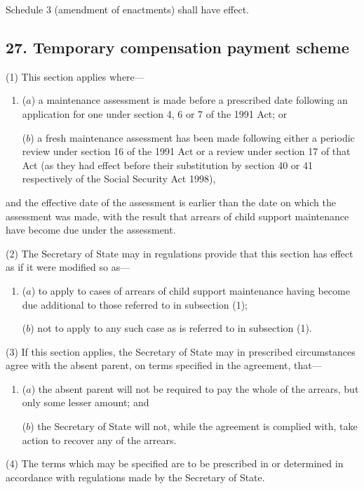 \documentclass[12pt,a4paper]{article}
\begin{document}
Schedule 3 (amendment of enactments) shall have effect.

\subsection{27. Temporary compensation payment scheme}

(1) This section applies where—
\begin{enumerate}\item[]
($a$) a maintenance assessment is made before a prescribed date following an application for one under section 4, 6 or 7 of the 1991 Act; or

($b$) a fresh maintenance assessment has been made following either a periodic review under section 16 of the 1991 Act or a review under section 17 of that Act (as they had effect before their substitution by section 40 or 41 respectively of the Social Security Act 1998),
\end{enumerate}
and the effective date of the assessment is earlier than the date on which the assessment was made, with the result that arrears of child support maintenance have become due under the assessment.

(2) The Secretary of State may in regulations provide that this section has effect as if it were modified so as—
\begin{enumerate}\item[]
($a$) to apply to cases of arrears of child support maintenance having become due additional to those referred to in subsection (1);

($b$) not to apply to any such case as is referred to in subsection (1).
\end{enumerate}

(3) If this section applies, the Secretary of State may in prescribed circumstances agree with the absent parent, on terms specified in the agreement, that—
\begin{enumerate}\item[]
($a$) the absent parent will not be required to pay the whole of the arrears, but only some lesser amount; and

($b$) the Secretary of State will not, while the agreement is complied with, take action to recover any of the arrears.
\end{enumerate}

(4) The terms which may be specified are to be prescribed in or determined in accordance with regulations made by the Secretary of State.
\end{document}
